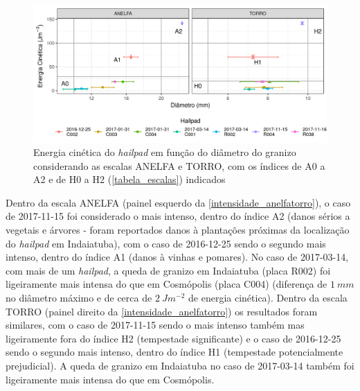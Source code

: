 \begin{figure}[hbt]
	\begin{center}
		\caption{Energia cinética do \textit{hailpad} em função do diâmetro do granizo considerando as escalas ANELFA e TORRO, com os índices de A0 a A2 e de H0 a H2 (\autoref{tabela_escalas}) indicados} 
		\label{intensidade_anelfatorro}
		\includegraphics[width=\columnwidth]{../Hailpads_Processing/figures/data_anelfa_torro_ptbr.png}
	\end{center}
\end{figure}

Dentro da escala ANELFA (painel esquerdo da \autoref{intensidade_anelfatorro}), o caso de 2017-11-15 foi considerado o mais intenso, dentro do índice A2 (danos sérios a vegetais e árvores - foram reportados danos à plantações próximas da localização do \textit{hailpad} em Indaiatuba), com o caso de 2016-12-25 sendo o segundo mais intenso, dentro do índice A1 (danos à vinhas e pomares). No caso de 2017-03-14, com mais de um \textit{hailpad}, a queda de granizo em Indaiatuba (placa R002) foi ligeiramente mais intensa do que em Cosmópolis (placa C004) (diferença de $1\:mm$ no diâmetro máximo e de cerca de $2\:Jm^{-2}$ de energia cinética). Dentro da escala TORRO (painel direito da \autoref{intensidade_anelfatorro}) os resultados foram similares, com o caso de 2017-11-15 sendo o mais intenso também mas ligeiramente fora do índice H2 (tempestade significante) e o caso de 2016-12-25 sendo o segundo mais intenso, dentro do índice H1 (tempestade potencialmente prejudicial). A queda de granizo em Indaiatuba no caso de 2017-03-14 também foi ligeiramente mais intensa do que em Cosmópolis.

